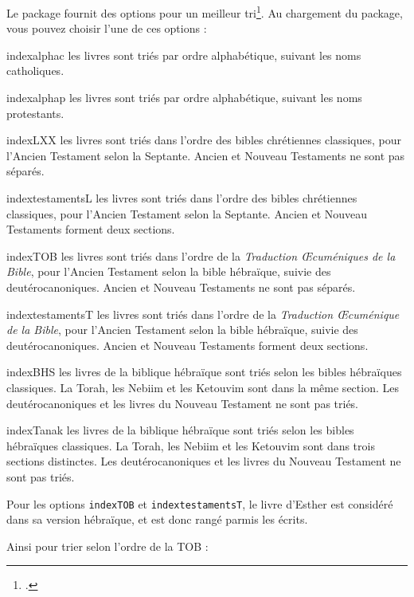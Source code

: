 Le package fournit des options pour un meilleur tri\footcite[Pour l'Ancien Testament, les protestants suivent le canon juif pour son contenu mais utilisent l'ordre du canon catholique : voir][]{canons}. Au chargement du package, vous pouvez choisir l'une de ces options :
 \begin{choix}
 \item[indexalphac] les livres sont triés par ordre alphabétique, suivant les noms catholiques.
\item[indexalphap] les livres sont triés par ordre alphabétique, suivant les noms protestants.
\item[indexLXX]les livres sont triés dans l'ordre des bibles chrétiennes classiques, pour l'Ancien Testament  selon la Septante. Ancien et Nouveau Testaments ne sont pas séparés.
\item[indextestamentsL] les livres sont triés dans l'ordre des bibles chrétiennes classiques, pour l'Ancien Testament  selon la Septante. Ancien et Nouveau Testaments forment deux sections.
\item[indexTOB] les livres sont triés dans l'ordre de la \emph{Traduction Œcuméniques de la Bible}, pour l'Ancien Testament  selon la bible hébraïque, suivie des deutérocanoniques. Ancien et Nouveau Testaments ne sont pas séparés.
\item[indextestamentsT] les livres sont triés dans l'ordre de la \emph{Traduction Œcuménique de la Bible}, pour l'Ancien Testament  selon la bible hébraïque, suivie des deutérocanoniques. Ancien et Nouveau Testaments forment deux sections.
\item[indexBHS] les livres de la biblique hébraïque sont triés selon les bibles hébraïques classiques. La Torah, les Nebiim et les Ketouvim sont dans la même section. Les deutérocanoniques et les livres du Nouveau Testament ne sont pas triés.
\item[indexTanak] les livres de la biblique hébraïque sont triés selon les bibles hébraïques classiques. La Torah, les Nebiim et les Ketouvim sont dans trois sections distinctes. Les deutérocanoniques et les livres du Nouveau Testament ne sont pas triés.
\end{choix}

Pour les options \verb|indexTOB| et \verb|indextestamentsT|, le livre d'Esther est considéré dans sa version hébraïque, et est donc rangé parmis les  écrits.

Ainsi pour trier selon l'ordre de la TOB : 

\begin{latexcode}
\usepackage[indexTOB]{bibleref-french}
\end{latexcode}


